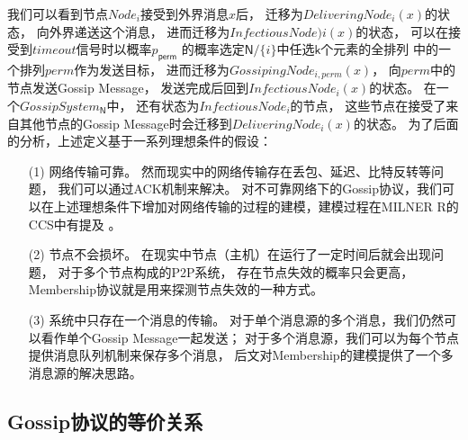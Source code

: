 我们可以看到节点$Node_i$接受到外界消息$x$后，
迁移为$DeliveringNode_i(x)$的状态，
向外界递送这个消息，
进而迁移为$InfectiousNode)i(x)$的状态，
可以在接受到$timeout$信号时以概率$p_{\mathsf{perm}}$
的概率选定$\mathsf{N}/\{i\}$中任选$\mathsf{k}$个元素的全排列
中的一个排列$perm$作为发送目标，
进而迁移为$GossipingNode_{i,perm}(x)$，
向$perm$中的节点发送Gossip Message，
发送完成后回到$InfectiousNode_i(x)$的状态。
在一个$GossipSystem_{\mathsf{N}}$中，
还有状态为$InfectiousNode_i$的节点，
这些节点在接受了来自其他节点的Gossip Message时会迁移到$DeliveringNode_i(x)$的状态。
为了后面的分析，上述定义基于一系列理想条件的假设：
\begin{itemize}
   \item [(1)] {网络传输可靠。
   然而现实中的网络传输存在丢包、延迟、比特反转等问题，
   我们可以通过ACK机制来解决。
   对不可靠网络下的Gossip协议，我们可以在上述理想条件下增加对网络传输的过程的建模，建模过程在MILNER R的CCS中有提及
   \cite{Milner_CCS}。
   }
   \item [(2)] {节点不会损坏。
   在现实中节点（主机）在运行了一定时间后就会出现问题，
   对于多个节点构成的P2P系统，
   存在节点失效的概率只会更高\cite{MTTF}，
   Membership协议就是用来探测节点失效的一种方式。
   }
   \item [(3)] {
      系统中只存在一个消息的传输。
      对于单个消息源的多个消息，我们仍然可以看作单个Gossip Message一起发送；
      对于多个消息源，我们可以为每个节点提供消息队列机制来保存多个消息，
      后文对Membership的建模提供了一个多消息源的解决思路。
      }
\end{itemize}

\subsection{Gossip协议的等价关系}


